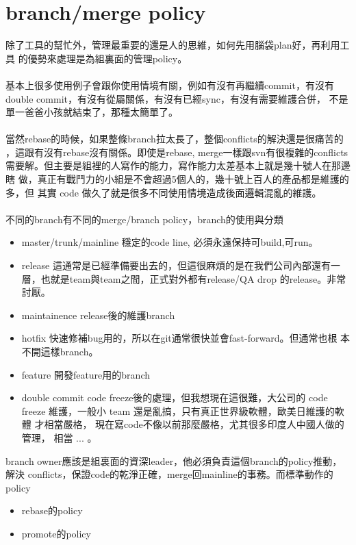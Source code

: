   \section{branch/merge policy}
  除了工具的幫忙外，管理最重要的還是人的思維，如何先用腦袋plan好，再利用工具
  的優勢來處理是為組裏面的管理policy。
  \\\\
  基本上很多使用例子會跟你使用情境有關，例如有沒有再繼續commit，有沒有
  double commit，有沒有從屬關係，有沒有已經sync，有沒有需要維護合併，
  不是單一爸爸小孩就結束了，那種太簡單了。
  \\\\
  當然rebase的時候，如果整條branch拉太長了，整個conflicts的解決還是很痛苦的
  ，這跟有沒有rebase沒有關係。即使是rebase, merge一樣跟svn有很複雜的conflicts
  需要解。但主要是組裡的人寫作的能力，寫作能力太差基本上就是幾十號人在那邊瞎
  做，真正有戰鬥力的小組是不會超過5個人的，幾十號上百人的產品都是維護的多，但
  其實 code 做久了就是很多不同使用情境造成後面邏輯混亂的維護。
  \\\\
  不同的branch有不同的merge/branch policy，branch的使用與分類
  \begin{itemize}
    \item master/trunk/mainline 穩定的code line, 必須永遠保持可build,可run。
    \item release 這通常是已經準備要出去的，但這很麻煩的是在我們公司內部還有一
      層，也就是team與team之間，正式對外都有release/QA drop 的release。非常
      討厭。
    \item maintainence release後的維護branch
    \item hotfix 快速修補bug用的，所以在git通常很快並會fast-forward。但通常也根
      本不開這樣branch。
    \item feature 開發feature用的branch
    \item double commit code freeze後的處理，但我想現在這很難，大公司的 code
      freeze 維護，一般小 team 還是亂搞，只有真正世界級軟體，歐美日維護的軟體
      才相當嚴格， 現在寫code不像以前那麼嚴格，尤其很多印度人中國人做的管理，
      相當 ... 。
  \end{itemize}
  branch owner應該是組裏面的資深leader，他必須負責這個branch的policy推動，解決
  conflicts，保證code的乾淨正確，merge回mainline的事務。而標準動作的policy
  \begin{itemize}
    \item rebase的policy
    \item promote的policy
  \end{itemize}

